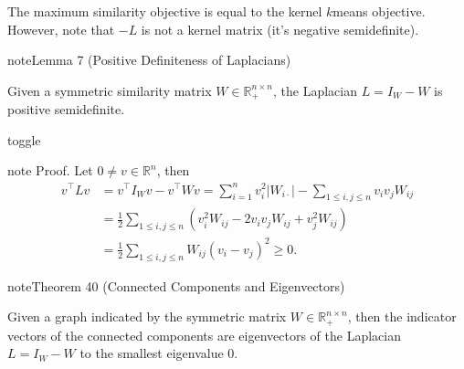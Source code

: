 \documentclass[letterpaper,10pt,english]{jupyterBook}
\begin{document}
\sphinxAtStartPar
The maximum similarity objective is equal to the kernel \(k\)\sphinxhyphen{}means objective. However, note that \(-L\) is not a kernel matrix (it’s negative semi\sphinxhyphen{}definite).
\label{clustering_spectral:lemma-3}
\begin{sphinxadmonition}{note}{Lemma 7 (Positive Definiteness of Laplacians)}



\sphinxAtStartPar
Given a symmetric similarity matrix \(W\in\mathbb{R}^{n\times n}_+\), the Laplacian \(L=I_W -W\) is positive semi\sphinxhyphen{}definite.
\end{sphinxadmonition}

\begin{sphinxuseclass}{toggle}
\begin{sphinxadmonition}{note}
\sphinxAtStartPar
Proof. Let \(0\neq v\in\mathbb{R}^n\), then
\begin{align*}
v^\top Lv &= v^\top I_W v - v^\top W v 
= \sum_{i=1}^n v_i^2 \lvert W_{i\cdot}\rvert -\sum_{1\leq i,j\leq n} v_iv_jW_{ij}\\
&= \frac{1}{2} \sum_{1\leq i,j \leq n} (v_i^2 W_{ij} -2 v_iv_jW_{ij} +v_j^2W_{ij}) \\
&= \frac{1}{2} \sum_{1\leq i,j \leq n} W_{ij} (v_i-v_j)^2 \geq 0.
\end{align*}\end{sphinxadmonition}

\end{sphinxuseclass}\label{clustering_spectral:theorem-4}
\begin{sphinxadmonition}{note}{Theorem 40 (Connected Components and Eigenvectors)}



\sphinxAtStartPar
Given a graph indicated by the symmetric matrix \(W\in\mathbb{R}^{n\times n}_+\), then the indicator vectors of the connected components are eigenvectors of the Laplacian \(L=I_W-W\) to the smallest eigenvalue \(0\).
\end{sphinxadmonition}
\end{document}

